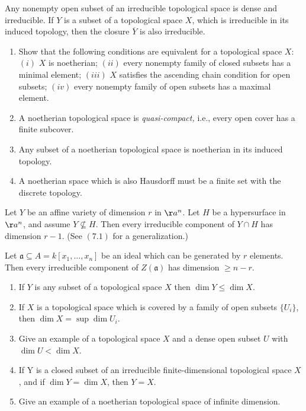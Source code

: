 \begin{exercise}[1.6]
    Any nonempty open subset of an irreducible topological space is dense and
    irreducible.
    If $Y$ is a subset of a topological space $X$, which is irreducible in its
    induced topology, then the closure $\overline{Y}$ is also irreducible.
\end{exercise}

\begin{exercise}[1.7]
    \begin{enumerate}
        \item Show that the following conditions are equivalent for a topological
        space $X$: $(i)$ $X$ is noetherian; $(ii)$ every nonempty family of
        closed subsets has a minimal element; $(iii)$ $X$ satisfies the ascending
        chain condition for open subsets; $(iv)$ every nonempty family of open
        subsets has a maximal element.
      \item A noetherian topological space is \emph{quasi-compact,} i.e., every
        open cover has a finite subcover.
      \item Any subset of a noetherian topological space is noetherian in its
        induced topology.
      \item A noetherian space which is also Hausdorff must be a finite set with
        the discrete topology.    
    \end{enumerate}
\end{exercise}

\begin{exercise}[1.8]
    Let $Y$ be an affine variety of dimension $r$ in $\aa^n$.
    Let $H$ be a hypersurface in $\aa^n$, and assume $Y \not\subseteq H$.
    Then every irreducible component of $Y \cap H$ has dimension $r-1$.
    (See $(7.1)$ for a generalization.)
\end{exercise}

\begin{exercise}[1.9]
    Let $\mathfrak{a} \subseteq A = k[x_1,\ldots,x_n]$ be an ideal which can be
    generated by $r$ elements.
    Then every irreducible component of $Z(\mathfrak{a})$ has dimension $\ge n-r$.
\end{exercise}

\begin{exercise}[1.10]
    \begin{enumerate}
        \item If $Y$ is any subset of a topological space $X$ then $\dim Y \leq \dim X$. 
        \item If $X$ is a topological space which is covered by a family of open
          subsets $\{U_{i}\}$, then $\dim X = \sup \dim U_i$.
        \item Give an example of a topological space $X$ and a dense open subset $U$
          with $\dim U < \dim X$. 
        \item If Y is a closed subset of an irreducible finite-dimensional topological space $X$, and if $\dim Y = \dim X$, then $Y= X$. 
        \item Give an example of a noetherian topological space of infinite dimension.  
    \end{enumerate}
\end{exercise}

